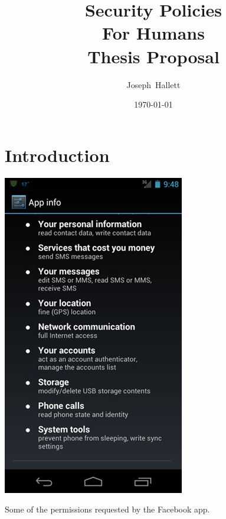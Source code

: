 \documentclass[a4paper,sfsidenotes]{tufte-book}
\title{Security Policies\\For Humans\\Thesis Proposal}
\author{Joseph~Hallett}
\date\today
\begin{document}
\maketitle
\setcounter{tocdepth}{3}
\tableofcontents
\pagebreak

\section{Introduction}

\begin{marginfigure}
  \includegraphics[width=\linewidth]{img/facebookperms.jpeg}
  \caption{Some of the permissions requested by the Facebook app.}
  \label{fig:fb}
\end{marginfigure}
\end{document}

